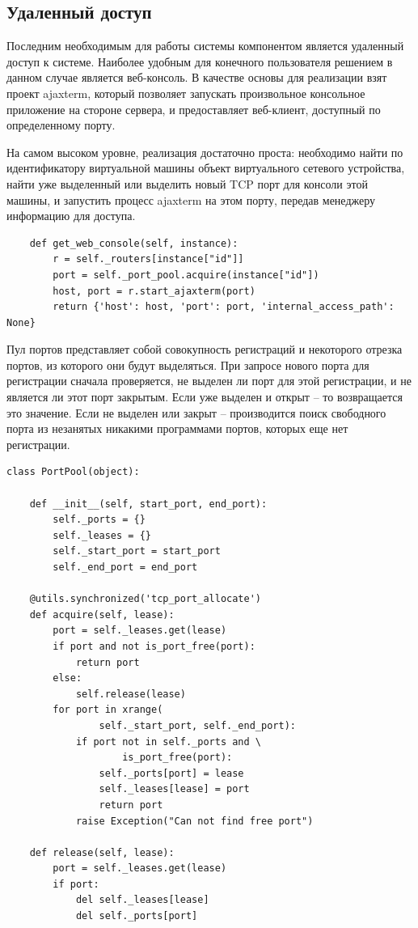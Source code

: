 \subsection{Удаленный доступ}

Последним необходимым для работы системы компонентом является удаленный доступ к 
системе. Наиболее удобным для конечного пользователя решением в данном случае является
веб-консоль. В качестве основы для реализации взят проект ajaxterm, который позволяет
запускать произвольное консольное приложение на стороне сервера, и предоставляет
веб-клиент, доступный по определенному порту.

На самом высоком уровне, реализация достаточно проста: необходимо найти по идентификатору
виртуальной машины объект виртуального сетевого устройства, найти уже выделенный или выделить
новый TCP порт для консоли этой машины, и запустить процесс ajaxterm на этом порту, передав
менеджеру информацию для доступа.
\begin{lstlisting}
    def get_web_console(self, instance):
        r = self._routers[instance["id"]]
        port = self._port_pool.acquire(instance["id"])
        host, port = r.start_ajaxterm(port)
        return {'host': host, 'port': port, 'internal_access_path': None}
\end{lstlisting}

Пул портов представляет собой совокупность регистраций и некоторого отрезка портов, из которого
они будут выделяться. При запросе нового порта для регистрации сначала проверяется, не 
выделен ли порт для этой регистрации, и не является ли этот порт закрытым. 
Если уже выделен и открыт -- то возвращается это значение. Если
не выделен или закрыт -- производится поиск свободного порта из незанятых никакими 
программами портов, которых еще нет регистрации.
\begin{lstlisting}
class PortPool(object):

    def __init__(self, start_port, end_port):
        self._ports = {}
        self._leases = {}
        self._start_port = start_port
        self._end_port = end_port

    @utils.synchronized('tcp_port_allocate')
    def acquire(self, lease):
        port = self._leases.get(lease)
        if port and not is_port_free(port):
            return port
        else:
            self.release(lease)
        for port in xrange(
                self._start_port, self._end_port):
            if port not in self._ports and \
                    is_port_free(port):
                self._ports[port] = lease
                self._leases[lease] = port
                return port
            raise Exception("Can not find free port")

    def release(self, lease):
        port = self._leases.get(lease)
        if port:
            del self._leases[lease]
            del self._ports[port]
\end{lstlisting}

